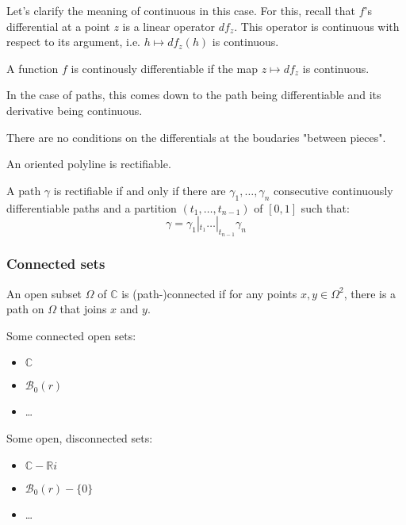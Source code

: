\begin{note}
    Let's clarify the meaning of continuous in this case. For this, recall that $f$'s differential at a point $z$ is a linear operator $df_z$. This operator is continuous with respect to its argument, i.e. $h \mapsto df_z(h)$ is continuous.

    A function $f$ is continously differentiable if the map $z \mapsto df_z$ is continuous.

    In the case of paths, this comes down to the path being differentiable and its derivative being continuous.
\end{note}

\begin{note}
    There are no conditions on the differentials at the boudaries "between pieces".
\end{note}

\begin{example}
    An oriented polyline is rectifiable.
\end{example}

\begin{thm*}
    A path $\gamma$ is rectifiable if and only if there are $\gamma_1, \dots, \gamma_n$ consecutive continuously differentiable paths and a partition $(t_1, \dots, t_{n-1})$ of $[0,1]$ such that:
    $$\gamma = \gamma_1 |_{t_1} \dots |_{t_{n-1}} \gamma_n$$
\end{thm*}

\subsubsection{Connected sets}

\begin{defi}
    An open subset $\Omega$ of $\mathbb{C}$ is (path-)connected if for any points $x,y \in \Omega^2$, there is a path on $\Omega$ that joins $x$ and $y$. 
\end{defi}

\begin{example}
    
    Some connected open sets:
    \begin{itemize}
        \item $\mathbb{C}$
        \item $\mathcal{B}_0(r)$
        \item \dots
    \end{itemize}
    Some open, disconnected sets:
    \begin{itemize}
        \item $\mathbb{C} -\mathbb{R}i$
        \item $\mathcal{B}_0(r) - \lbrace 0 \rbrace$
        \item \dots
    \end{itemize}
\end{example}

